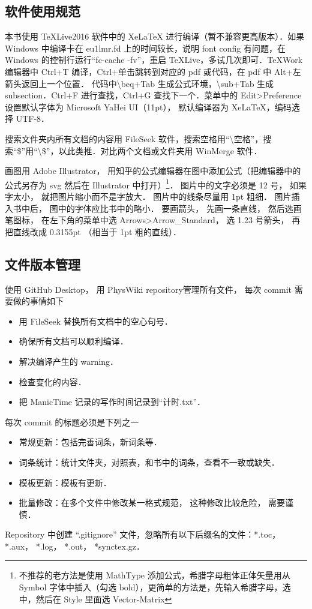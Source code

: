 
\subsection{软件使用规范}
本书使用 TeXLive2016 软件中的 XeLaTeX 进行编译（暂不兼容更高版本）．如果 Windows 中编译卡在 eu1lmr.fd 上的时间较长，说明 font config 有问题，在 Windows 的控制行运行“fc-cache -fv”，重启 TeXLive，多试几次即可．TeXWork 编辑器中 Ctrl+T 编译，Ctrl+单击跳转到对应的 pdf 或代码，在 pdf 中 Alt+左箭头返回上一个位置． 代码中\textbackslash beq+Tab 生成公式环境，\textbackslash sub+Tab 生成 subsection．Ctrl+F 进行查找，Ctrl+G 查找下一个．菜单中的 Edit>Preference 设置默认字体为 Microsoft YaHei UI（11pt）， 默认编译器为 XeLaTeX，编码选择 UTF-8．

搜索文件夹内所有文档的内容用 FileSeek 软件，搜索空格用“\textbackslash 空格”，搜索“\$”用“\textbackslash \$”，以此类推．对比两个文档或文件夹用 WinMerge 软件．

画图用 Adobe Illustrator， 用知乎的公式编辑器在图中添加公式（把编辑器中的公式另存为 svg 然后在 Illustrator 中打开）\footnote{不推荐的老方法是使用 MathType 添加公式，希腊字母粗体正体矢量用从 Symbol 字体中插入（勾选 bold），更简单的方法是，先输入希腊字母，选中，然后在 Style 里面选 Vector-Matrix}． 图片中的文字必须是 12 号， 如果字太小， 就把图片缩小而不是字放大． 图片中的线条尽量用 1pt 粗细． 图片插入书中后， 图中的字体应比书中的略小． 要画箭头， 先画一条直线， 然后选画笔图标， 在左下角的菜单中选 Arrows>Arrow\_Standard， 选 1.23 号箭头， 再把直线改成 0.3155pt （相当于 1pt 粗的直线）．

\subsection{文件版本管理}
使用 GitHub Desktop， 用 PhysWiki repository管理所有文件， 每次 commit 需要做的事情如下
\begin{itemize}
\item 用 FileSeek 替换所有文档中的空心句号．
\item 确保所有文档可以顺利编译．
\item 解决编译产生的 warning．
\item 检查变化的内容．
\item 把 ManicTime 记录的写作时间记录到“计时.txt”．
\end{itemize}
每次 commit 的标题必须是下列之一
\begin{itemize}
\item 常规更新：包括完善词条，新词条等．
\item 词条统计：统计文件夹，对照表，和书中的词条，查看不一致或缺失．
\item 模板更新：模板有更新．
\item 批量修改：在多个文件中修改某一格式规范， 这种修改比较危险， 需要谨慎．
\end{itemize}
Repository 中创建 “.gitignore” 文件，忽略所有以下后缀名的文件：*.toc， *.aux， *.log， *.out， *synctex.gz．

